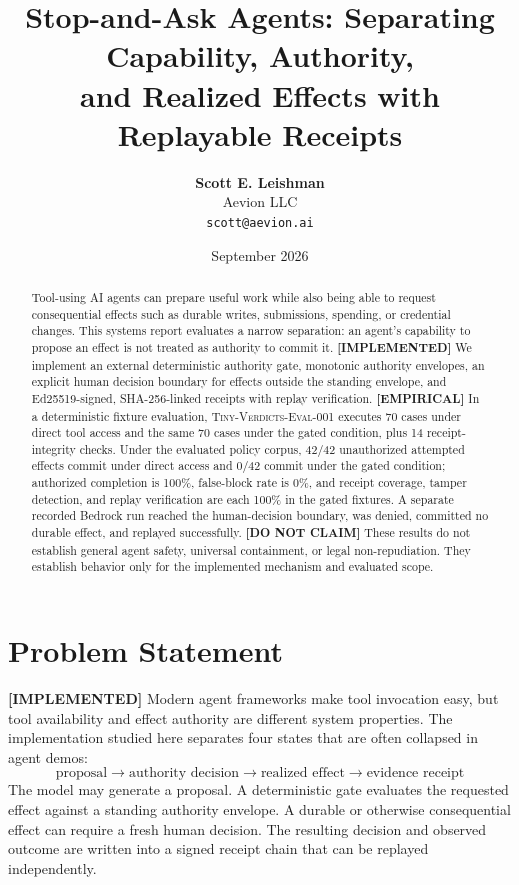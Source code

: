 \documentclass[10pt,twocolumn]{article}
\title{\textbf{Stop-and-Ask Agents: Separating Capability, Authority,\\and Realized Effects with Replayable Receipts}}
\author{
  \textbf{Scott E. Leishman}\\
  Aevion LLC\\
  \texttt{scott@aevion.ai}
}
\date{September 2026}
\newcommand{\implemented}{\textbf{[IMPLEMENTED] }}
\newcommand{\empirical}{\textbf{[EMPIRICAL] }}
\newcommand{\donotclaim}{\textbf{[DO NOT CLAIM] }}
\begin{document}
\maketitle

\begin{abstract}
Tool-using AI agents can prepare useful work while also being able to request consequential effects such as durable writes, submissions, spending, or credential changes. This systems report evaluates a narrow separation: an agent's capability to propose an effect is not treated as authority to commit it. \implemented We implement an external deterministic authority gate, monotonic authority envelopes, an explicit human decision boundary for effects outside the standing envelope, and Ed25519-signed, SHA-256-linked receipts with replay verification. \empirical In a deterministic fixture evaluation, \textsc{Tiny-Verdicts-Eval-001} executes 70 cases under direct tool access and the same 70 cases under the gated condition, plus 14 receipt-integrity checks. Under the evaluated policy corpus, 42/42 unauthorized attempted effects commit under direct access and 0/42 commit under the gated condition; authorized completion is 100\%, false-block rate is 0\%, and receipt coverage, tamper detection, and replay verification are each 100\% in the gated fixtures. A separate recorded Bedrock run reached the human-decision boundary, was denied, committed no durable effect, and replayed successfully. \donotclaim These results do not establish general agent safety, universal containment, or legal non-repudiation. They establish behavior only for the implemented mechanism and evaluated scope.
\end{abstract}

\section{Problem Statement}
\implemented Modern agent frameworks make tool invocation easy, but tool availability and effect authority are different system properties. The implementation studied here separates four states that are often collapsed in agent demos:
\begin{equation*}
\text{proposal} \longrightarrow \text{authority decision} \longrightarrow \text{realized effect} \longrightarrow \text{evidence receipt}
\end{equation*}
The model may generate a proposal. A deterministic gate evaluates the requested effect against a standing authority envelope. A durable or otherwise consequential effect can require a fresh human decision. The resulting decision and observed outcome are written into a signed receipt chain that can be replayed independently.
\end{document}
